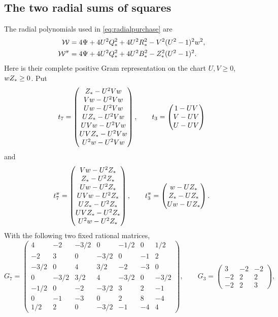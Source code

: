 \subsection*{The two radial sums of squares}
The radial polynomials used in \eqref{eq:radialpurchase} are
\begin{align}
 \mathcal W&=4\Psi+4U^2Q_*^2+4U^2R_*^2-V^2(U^2-1)^2w^2,\notag\\
 \mathcal W^\pi&=4\Psi+4U^2Q_*^2+4U^2B_*^2-Z_*^2(U^2-1)^2 .
 \label{eq:radialpolys}
\end{align}
Here is their complete positive Gram representation on the chart
$U,V\geq0$, $wZ_*\geq0$.
Put
\[
 t_7=\begin{pmatrix}
 Z_*-U^2Vw\\Vw-U^2Vw\\Uw-U^2Vw\\UZ_*-U^2Vw\\
 UVw-U^2Vw\\UVZ_*-U^2Vw\\U^2w-U^2Vw
 \end{pmatrix},\qquad
 t_3=\begin{pmatrix}1-UV\\V-UV\\U-UV\end{pmatrix}
\]
and
\[
 t_7^\pi=\begin{pmatrix}
 Vw-U^2Z_*\\Z_*-U^2Z_*\\Uw-U^2Z_*\\UVw-U^2Z_*\\
 UZ_*-U^2Z_*\\UVZ_*-U^2Z_*\\U^2w-U^2Z_*
 \end{pmatrix},\qquad
 t_3^\pi=\begin{pmatrix}w-UZ_*\\Z_*-UZ_*\\Uw-UZ_*\end{pmatrix}.
\]
With the following two fixed rational matrices,
\[
 G_7=\begin{pmatrix}
4&-2&-3/2&0&-1/2&0&1/2\\
-2&3&0&-3/2&0&-1&2\\
-3/2&0&4&3/2&-2&-3&0\\
0&-3/2&3/2&4&-3/2&0&-3/2\\
-1/2&0&-2&-3/2&3&2&-1\\
0&-1&-3&0&2&8&-4\\
1/2&2&0&-3/2&-1&-4&4
\end{pmatrix},\qquad
 G_3=\begin{pmatrix}3&-2&-2\\-2&2&2\\-2&2&3\end{pmatrix},
\]
